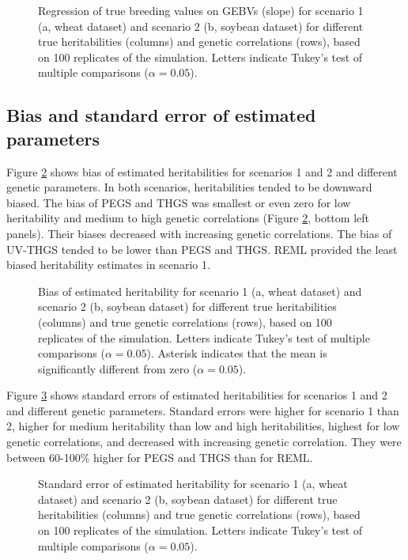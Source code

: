 \documentclass{bmcart}
\def\texttt{[image: ]}
\begin{document}
\begin{figure}[ht]
  \caption{\small{Regression of true breeding values on GEBVs (slope) for scenario 1 (a, wheat dataset) and scenario 2 (b, soybean dataset) for different true heritabilities (columns) and genetic correlations (rows), based on 100 replicates of the simulation. Letters indicate Tukey's test of multiple comparisons ($\alpha=0.05$).}}
  \label{Slope}
\end{figure}

\subsection{Bias and standard error of estimated parameters}

Figure \ref{FigBiasH2} shows bias of estimated heritabilities for scenarios 1 and 2 and different genetic parameters. In both scenarios, heritabilities tended to be downward biased. The bias of PEGS and THGS was smallest or even zero for low heritability and medium to high genetic correlations (Figure \ref{FigBiasH2}, bottom left panels). Their biases decreased with increasing genetic correlations. The bias of UV-THGS tended to be lower than PEGS and THGS. REML provided the least biased heritability estimates in scenario 1. 

\begin{figure}%
  \caption{\small{Bias of estimated heritability for scenario 1 (a, wheat dataset) and scenario 2 (b, soybean dataset) for different true heritabilities (columns) and true genetic correlations (rows), based on 100 replicates of the simulation. Letters indicate Tukey's test  of multiple comparisons ($\alpha=0.05$). Asterisk indicates that the mean is significantly different from zero ($\alpha=0.05$).}}
  \label{FigBiasH2}
\end{figure}

Figure \ref{FigPrecH2} shows standard errors of estimated heritabilities for scenarios 1 and 2 and different genetic parameters. Standard errors were higher for scenario 1 than 2, higher for medium heritability than low and high heritabilities, highest for low genetic correlations, and decreased with increasing genetic correlation. They were between 60-100\% higher for PEGS and THGS than for REML.

\begin{figure}%
  \caption{\small{Standard error of estimated heritability for scenario 1 (a, wheat dataset) and scenario 2 (b, soybean dataset) for different true heritabilities (columns) and true genetic correlations (rows), based on 100 replicates of the simulation. Letters indicate Tukey's test of multiple comparisons ($\alpha=0.05$).}}
  \label{FigPrecH2}
\end{figure}
\end{document}
